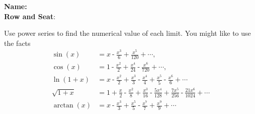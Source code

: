 \documentclass[fleqn,answers,12pt]{exam}
\begin{document}
\large
\vspace{0.1in}
\noindent{}
\textbf{Name:} \hrulefill \\
\noindent {}
\textbf{Row and Seat}:\hrulefill\\
\vspace{0.1in}



\vspace{0.1in}



\begin{questions}
\question Use power series to find the numerical value of each limit. You might like to use the facts
\begin{align*}
\sin(x) &=  x\operatorname{-}\frac{{{x}^{3}}}{6}\operatorname{+}\frac{{{x}^{5}}}{120}\operatorname{+} \cdots, \\
\cos(x) &=  1\operatorname{-}\frac{{{x}^{2}}}{2}\operatorname{+}\frac{{{x}^{4}}}{24}\operatorname{-}\frac{{{x}^{6}}}{720}\operatorname{+} \cdots, \\
\ln(1+x) &= 
 x\operatorname{-}\frac{{{x}^{2}}}{2}\operatorname{+}\frac{{{x}^{3}}}{3}\operatorname{-}\frac{{{x}^{4}}}{4}\operatorname{+}\frac{{{x}^{5}}}{5}\operatorname{-}\frac{{{x}^{6}}}{6}\operatorname{+} \cdots \\
\sqrt{1+x} &= 1\operatorname{+}\frac{x}{2}\operatorname{-}\frac{{{x}^{2}}}{8}\operatorname{+}\frac{{{x}^{3}}}{16}\operatorname{-}\frac{5 {{x}^{4}}}{128}\operatorname{+}\frac{7 {{x}^{5}}}{256}\operatorname{-}\frac{21 {{x}^{6}}}{1024}\operatorname{+}\cdots \\
\arctan(x) &= x\operatorname{-}\frac{{{x}^{3}}}{3}\operatorname{+}\frac{{{x}^{5}}}{5}\operatorname{-}\frac{{{x}^{7}}}{7}\operatorname{+}\frac{{{x}^{9}}}{9}\operatorname{+} \cdots
\end{align*}

\end{questions}
\end{document}
